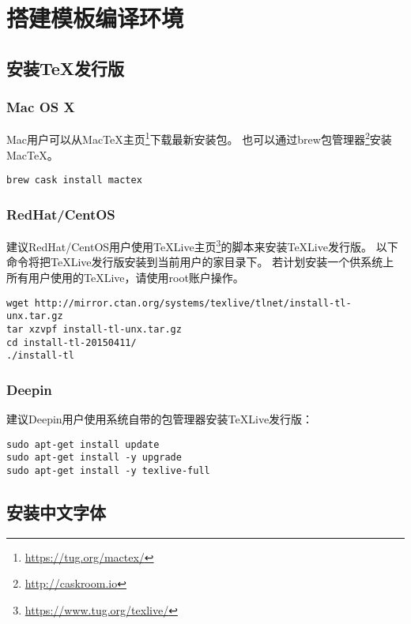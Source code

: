 \chapter{搭建模板编译环境}

\section{安装TeX发行版}

\subsection{Mac OS X}

Mac用户可以从MacTeX主页\footnote{\url{https://tug.org/mactex/}}下载最新安装包。
也可以通过brew包管理器\footnote{\url{http://caskroom.io}}安装MacTeX。

\begin{lstlisting}[basicstyle=\small\ttfamily, numbers=none]
brew cask install mactex
\end{lstlisting}

\subsection{RedHat/CentOS}

建议RedHat/CentOS用户使用TeXLive主页\footnote{\url{https://www.tug.org/texlive/}}的脚本来安装TeXLive发行版。
以下命令将把TeXLive发行版安装到当前用户的家目录下。
若计划安装一个供系统上所有用户使用的TeXLive，请使用root账户操作。

\begin{lstlisting}[basicstyle=\small\ttfamily, numbers=none]
wget http://mirror.ctan.org/systems/texlive/tlnet/install-tl-unx.tar.gz
tar xzvpf install-tl-unx.tar.gz
cd install-tl-20150411/
./install-tl
\end{lstlisting}

\subsection{Deepin}

建议Deepin用户使用系统自带的包管理器安装TeXLive发行版：

\begin{lstlisting}[basicstyle=\small\ttfamily, numbers=none]
sudo apt-get install update
sudo apt-get install -y upgrade
sudo apt-get install -y texlive-full
\end{lstlisting}

\section{安装中文字体}

